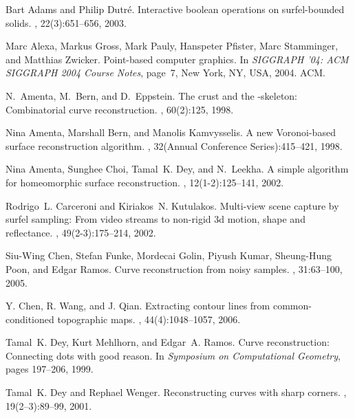 \documentclass{article}
\numberwithin{cntr}{section}
\numberwithin{equation}{section}
\begin{document}

\begin{thebibliography}{99}

Bart Adams and Philip Dutr\'{e}.
\newblock Interactive boolean operations on surfel-bounded solids.
, 22(3):651--656, 2003.

Marc Alexa, Markus Gross, Mark Pauly, Hanspeter Pfister, Marc Stamminger, and
  Matthias Zwicker.
\newblock Point-based computer graphics.
\newblock In {\em SIGGRAPH '04: ACM SIGGRAPH 2004 Course Notes}, page~7, New
  York, NY, USA, 2004. ACM.

N.~Amenta, M.~Bern, and D.~Eppstein.
\newblock The crust and the -skeleton: Combinatorial curve
  reconstruction.
, 60(2):125, 1998.

Nina Amenta, Marshall Bern, and Manolis Kamvysselis.
\newblock A new {Voronoi}-based surface reconstruction algorithm.
, 32({Annual Conference Series}):415--421,
  1998.

Nina Amenta, Sunghee Choi, Tamal~K. Dey, and N.~Leekha.
\newblock A simple algorithm for homeomorphic surface reconstruction.
, 12(1-2):125--141, 2002.

Rodrigo~L. Carceroni and Kiriakos~N. Kutulakos.
\newblock Multi-view scene capture by surfel sampling: From video streams to
  non-rigid 3d motion, shape and reflectance.
, 49(2-3):175--214, 2002.

Siu-Wing Chen, Stefan Funke, Mordecai Golin, Piyush Kumar,
Sheung-Hung Poon, and Edgar Ramos.
\newblock Curve reconstruction from noisy samples.
, 31:63--100, 2005.

Y. Chen, R. Wang, and J. Qian.
\newblock Extracting contour lines from common-conditioned topographic maps.
,
44(4):1048--1057, 2006.

Tamal~K. Dey, Kurt Mehlhorn, and Edgar~A. Ramos.
\newblock Curve reconstruction: Connecting dots with good reason.
\newblock In {\em Symposium on Computational Geometry}, pages 197--206, 1999.

Tamal~K. Dey and Rephael Wenger.
\newblock Reconstructing curves with sharp corners.
, 19(2--3):89--99, 2001.


\end{thebibliography}
\end{document}
